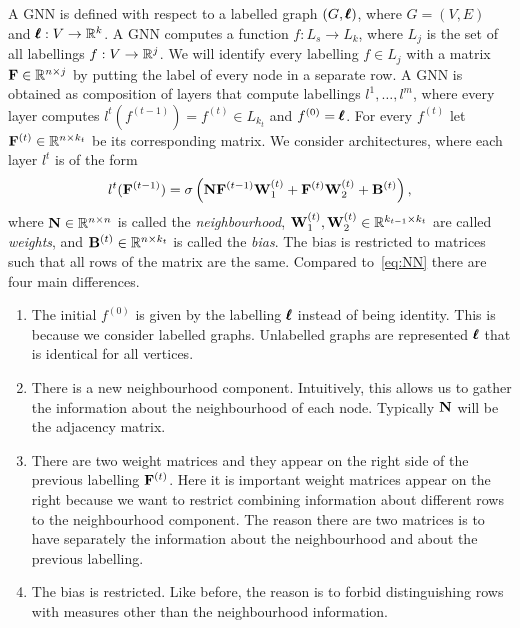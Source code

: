 A GNN is defined with respect to a labelled graph $(G,\pmb{\ell})$, where $G = (V,E)$ and $\pmb{\ell} : V \to \mathbb{R}^{k}$. A GNN computes a function $f : L_s \to L_k$, where $L_j$ is the set of all labellings $f : V \to \mathbb{R}^j$.
We will identify every labelling $f \in L_j$ with a matrix $\mathbf{F} \in \mathbb{R}^{n \times j}$ by putting the label of every node in a separate row.
A GNN is obtained as composition of layers that compute labellings $l^1, \ldots, l^m$, where every layer computes $l^t(f^{(t-1)}) = f^{(t)} \in L_{k_t}$ and $f^{(0)} = \pmb{\ell}$. For every $f^{(t)}$ let $\mathbf{F}^{(t)} \in \mathbb{R}^{n \times k_{t}}$ be its corresponding matrix. We consider architectures, where each layer $l^t$ is of the form
\begin{equation}\label{eq:GNNs}
l^t(\mathbf{F}^{(t-1)}) = \sigma \left( \mathbf{N}\mathbf{F}^{(t-1)}\mathbf{W}_1^{(t)} + \mathbf{F}^{(t)}\mathbf{W}_2^{(t)} + \mathbf{B}^{(t)} \right),
\end{equation}
where $\mathbf{N} \in \mathbb{R}^{n \times n}$ is called the \emph{neighbourhood}, $\mathbf{W}_1^{(t)}, \mathbf{W}_2^{(t)} \in \mathbb{R}^{k_{t-1} \times k_t}$ are called \emph{weights}, and $\mathbf{B}^{(t)} \in \mathbb{R}^{n \times k_t}$ is called the \emph{bias}. The bias is restricted to matrices such that all rows of the matrix are the same. Compared to~\eqref{eq:NN} there are four main differences.
\begin{enumerate}
\item The initial $f^{(0)}$ is given by the labelling $\pmb{\ell}$ instead of being identity. This is because we consider labelled graphs. Unlabelled graphs are represented $\pmb{\ell}$ that is identical for all vertices.
 \item There is a new neighbourhood component. Intuitively, this allows us to gather the information about the neighbourhood of each node. Typically $\mathbf{N}$ will be the adjacency matrix.
 \item There are two weight matrices and they appear on the right side of the previous labelling $\mathbf{F}^{(t)}$. Here it is important weight matrices appear on the right because we want to restrict combining information about different rows to the neighbourhood component. The reason there are two matrices is to have separately the information about the neighbourhood and about the previous labelling.
 \item The bias is restricted. Like before, the reason is to forbid distinguishing rows with measures other than the neighbourhood information.
\end{enumerate}


